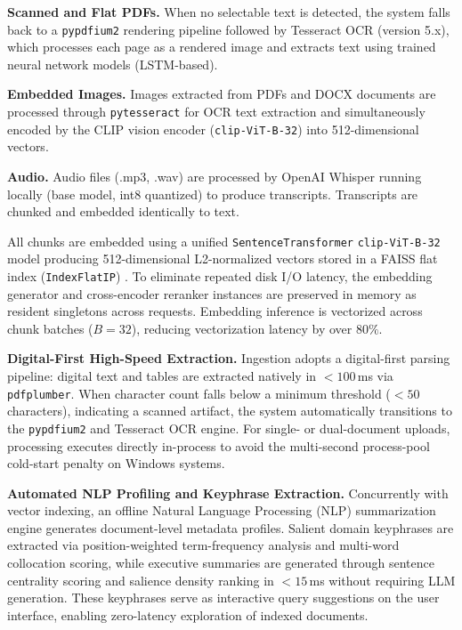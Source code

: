 \documentclass[conference]{IEEEtran}
\begin{document}
\textbf{Scanned and Flat PDFs.} When no selectable text is detected, the
system falls back to a \texttt{pypdfium2} rendering pipeline followed by
Tesseract OCR \cite{smith2007tesseract} (version 5.x), which processes each
page as a rendered image and extracts text using trained neural network
models (LSTM-based).

\textbf{Embedded Images.} Images extracted from PDFs and DOCX documents are
processed through \texttt{pytesseract} for OCR text extraction and
simultaneously encoded by the CLIP \cite{radford2021clip} vision encoder
(\texttt{clip-ViT-B-32}) into 512-dimensional vectors.

\textbf{Audio.} Audio files (.mp3, .wav) are processed by OpenAI
Whisper \cite{radford2023whisper} running locally (base model, int8 quantized)
to produce transcripts. Transcripts are chunked and embedded identically to
text.

All chunks are embedded using a unified \texttt{SentenceTransformer}
\texttt{clip-ViT-B-32} model producing 512-dimensional L2-normalized vectors
stored in a FAISS flat index (\texttt{IndexFlatIP}) \cite{johnson2019billion}.
To eliminate repeated disk I/O latency, the embedding generator and cross-encoder
reranker instances are preserved in memory as resident singletons across requests.
Embedding inference is vectorized across chunk batches ($B=32$), reducing
vectorization latency by over $80\%$.

\textbf{Digital-First High-Speed Extraction.} Ingestion adopts a digital-first
parsing pipeline: digital text and tables are extracted natively in $<100$\,ms via
\texttt{pdfplumber}. When character count falls below a minimum threshold ($<50$ characters),
indicating a scanned artifact, the system automatically transitions to the
\texttt{pypdfium2} and Tesseract OCR engine. For single- or dual-document uploads,
processing executes directly in-process to avoid the multi-second process-pool cold-start
penalty on Windows systems.

\textbf{Automated NLP Profiling and Keyphrase Extraction.} Concurrently with vector indexing,
an offline Natural Language Processing (NLP) summarization engine generates document-level
metadata profiles. Salient domain keyphrases are extracted via position-weighted term-frequency
analysis and multi-word collocation scoring, while executive summaries are generated through
sentence centrality scoring and salience density ranking in $<15$\,ms without requiring LLM
generation. These keyphrases serve as interactive query suggestions on the user interface,
enabling zero-latency exploration of indexed documents.
\end{document}
